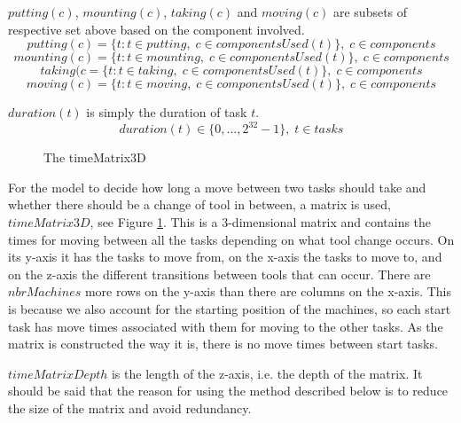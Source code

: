   \noindent $putting(c)$, $mounting(c)$, $taking(c)$ and $moving(c)$ are subsets of respective set above based on the component involved.
 \begin{equation}\label{eq:35}
 putting(c) = \{t : t \in putting, \; c \in componentsUsed(t)\}, \; c \in components
 \end{equation}
 \begin{equation}\label{eq:36}
 mounting(c) = \{t : t \in mounting, \; c \in componentsUsed(t)\}, \; c \in components
 \end{equation}
 \begin{equation}\label{eq:37}
 taking(c = \{t : t \in taking, \; c \in componentsUsed(t)\}, \; c \in components
 \end{equation}
 \begin{equation}\label{eq:38}
 moving(c) = \{t : t \in moving, \; c \in componentsUsed(t)\}, \; c \in components
 \end{equation}

  \noindent $duration(t)$ is simply the duration of task $t$.
 \begin{equation}\label{eq:42}
 duration(t) \in \{0 , \ldots , 2^{32}-1\}, \; t \in tasks
 \end{equation}
 
   \begin{figure}
   	\centering
    	
    	\caption{The timeMatrix3D}
    	\label{fig:3d_matrix}
   \end{figure}

\noindent For the model to decide how long a move between two tasks should take and whether there should be a change of tool in between, a matrix is used, $timeMatrix3D$, see Figure \ref{fig:3d_matrix}. This is a 3-dimensional matrix and contains the times for moving between all the tasks depending on what tool change occurs. On its y-axis it has the tasks to move from, on the x-axis the tasks to move to, and on the z-axis the different transitions between tools that can occur. There are $nbrMachines$ more rows on the y-axis than there are columns on the x-axis. This is because we also account for the starting position of the machines, so each start task has move times associated with them for moving to the other tasks. As the matrix is constructed the way it is, there is no move times between start tasks. 

 $timeMatrixDepth$ is the length of the z-axis, i.e. the depth of the matrix. It should be said that the reason for using the method described below is to reduce the size of the matrix and avoid redundancy.
 
